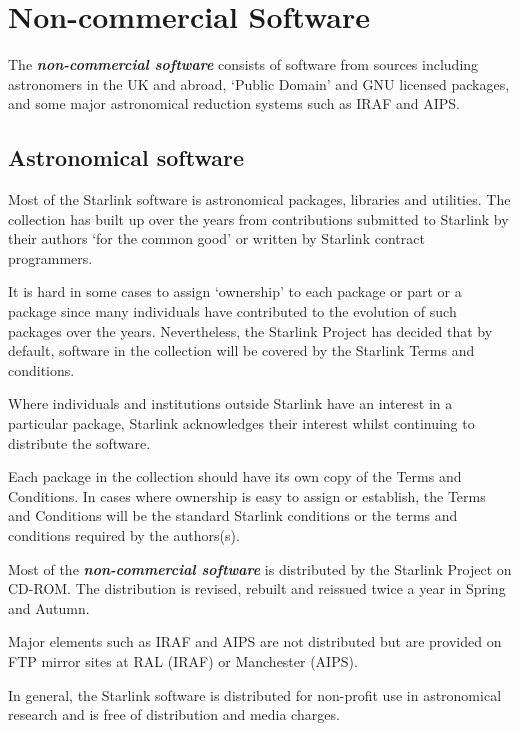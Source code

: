\documentclass[twoside,11pt]{article}
\newcommand{\xlabel}[1]{}
\renewcommand{\_}{\texttt{\symbol{95}}}
\begin{document}
\section{\xlabel{non-commercial_software}Non-commercial Software}
\label{non-commercial_software}

The \textbf{\textit{non-commercial software}} consists of software
from sources including astronomers in the UK and abroad, `Public
Domain' and GNU licensed packages, and some major astronomical
reduction systems such as IRAF and AIPS.

\subsection{\xlabel{astronomical_software}Astronomical software}
\label{astronomical_software}

Most of the Starlink software is astronomical packages, libraries and
utilities.  The collection has built up over the years from contributions
submitted to Starlink by their authors `for the common good' or written
by Starlink contract programmers.

It is hard in some cases to assign `ownership' to each package or part
or a package since many individuals have contributed to the evolution
of such packages over the years.  Nevertheless, the Starlink Project
has decided that by default, software in the collection will be covered
by the Starlink Terms and conditions.

Where individuals and institutions outside Starlink have an interest
in a particular package, Starlink acknowledges their interest whilst
continuing to distribute the software.

Each package in the collection should have its own copy of the
Terms and Conditions.  In cases where ownership is easy to assign or
establish, the Terms and Conditions will be the standard Starlink conditions
or the terms and conditions required by the authors(s).

Most of the \textbf{\textit{non-commercial software}} is distributed
by the Starlink Project on CD-ROM\@.  The distribution is revised, rebuilt and
reissued twice a year in Spring and Autumn.

Major elements such as IRAF and AIPS are not distributed but are provided
on FTP mirror sites at RAL (IRAF) or Manchester (AIPS).

In general, the Starlink software is distributed for non-profit use in
astronomical research and is free of distribution and media charges.
\end{document}

